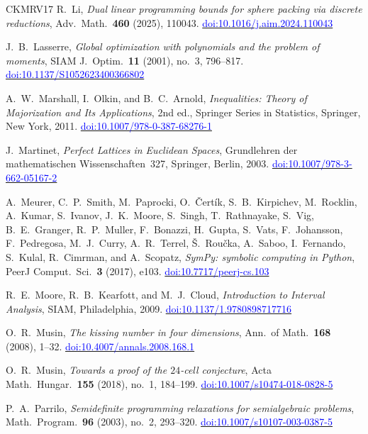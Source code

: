 \documentclass[11pt,reqno]{amsart}
\newcommand{\bluelink}[2]{\href{#1}{\textcolor{blue}{#2}}}
\renewcommand{\_}{\origunderscore\allowbreak}
\numberwithin{equation}{section}
\theoremstyle{plain}
\theoremstyle{definition}
\theoremstyle{remark}
\begin{document}
\begin{thebibliography}{CKMRV17}
R.~Li,
\textit{Dual linear programming bounds for sphere packing via discrete
reductions},
Adv.\ Math.\ \textbf{460} (2025), 110043.
\bluelink{https://doi.org/10.1016/j.aim.2024.110043}{doi:10.1016/j.aim.2024.110043}

J.~B.~Lasserre,
\textit{Global optimization with polynomials and the problem of moments},
SIAM J.\ Optim.\ \textbf{11} (2001), no.~3, 796--817.
\bluelink{https://doi.org/10.1137/S1052623400366802}{doi:10.1137/S1052623400366802}

A.~W.~Marshall, I.~Olkin, and B.~C.~Arnold,
\textit{Inequalities: Theory of Majorization and Its Applications}, 2nd ed.,
Springer Series in Statistics, Springer, New York, 2011.
\bluelink{https://doi.org/10.1007/978-0-387-68276-1}{doi:10.1007/978-0-387-68276-1}

J.~Martinet,
\textit{Perfect Lattices in Euclidean Spaces},
Grundlehren der mathematischen Wissenschaften~327,
Springer, Berlin, 2003.
\bluelink{https://doi.org/10.1007/978-3-662-05167-2}{doi:10.1007/978-3-662-05167-2}

A.~Meurer, C.~P.~Smith, M.~Paprocki, O.~\v{C}ert\'ik,
S.~B.~Kirpichev, M.~Rocklin, A.~Kumar, S.~Ivanov, J.~K.~Moore,
S.~Singh, T.~Rathnayake, S.~Vig, B.~E.~Granger, R.~P.~Muller,
F.~Bonazzi, H.~Gupta, S.~Vats, F.~Johansson, F.~Pedregosa,
M.~J.~Curry, A.~R.~Terrel, \v{S}.~Rou\v{c}ka, A.~Saboo,
I.~Fernando, S.~Kulal, R.~Cimrman, and A.~Scopatz,
\textit{{S}ym{P}y: symbolic computing in {P}ython},
PeerJ Comput.\ Sci.\ \textbf{3} (2017), e103.
\bluelink{https://doi.org/10.7717/peerj-cs.103}{doi:10.7717/peerj-cs.103}

R.~E.~Moore, R.~B.~Kearfott, and M.~J.~Cloud,
\textit{Introduction to Interval Analysis},
SIAM, Philadelphia, 2009.
\bluelink{https://doi.org/10.1137/1.9780898717716}{doi:10.1137/1.9780898717716}

O.~R.~Musin,
\textit{The kissing number in four dimensions},
Ann.\ of Math.\ \textbf{168} (2008), 1--32.
\bluelink{https://doi.org/10.4007/annals.2008.168.1}{doi:10.4007/annals.2008.168.1}

O.~R.~Musin,
\textit{Towards a proof of the $24$-cell conjecture},
Acta Math.\ Hungar.\ \textbf{155} (2018), no.~1, 184--199.
\bluelink{https://doi.org/10.1007/s10474-018-0828-5}{doi:10.1007/s10474-018-0828-5}

P.~A.~Parrilo,
\textit{Semidefinite programming relaxations for semialgebraic problems},
Math.\ Program.\ \textbf{96} (2003), no.~2, 293--320.
\bluelink{https://doi.org/10.1007/s10107-003-0387-5}{doi:10.1007/s10107-003-0387-5}


\end{thebibliography}
\end{document}

